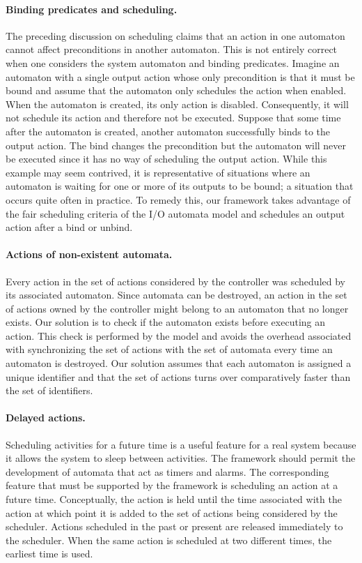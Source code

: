 \paragraph{Binding predicates and scheduling.}
The preceding discussion on scheduling claims that an action in one automaton cannot affect preconditions in another automaton.
This is not entirely correct when one considers the system automaton and binding predicates.
Imagine an automaton with a single output action whose only precondition is that it must be bound and assume that the automaton only schedules the action when enabled.
When the automaton is created, its only action is disabled.
Consequently, it will not schedule its action and therefore not be executed.
Suppose that some time after the automaton is created, another automaton successfully binds to the output action.
The bind changes the precondition but the automaton will never be executed since it has no way of scheduling the output action.
While this example may seem contrived, it is representative of situations where an automaton is waiting for one or more of its outputs to be bound; a situation that occurs quite often in practice.
To remedy this, our framework takes advantage of the fair scheduling criteria of the I/O automata model and schedules an output action after a bind or unbind.

\paragraph{Actions of non-existent automata.}
Every action in the set of actions considered by the controller was scheduled by its associated automaton.
Since automata can be destroyed, an action in the set of actions owned by the controller might belong to an automaton that no longer exists.
Our solution is to check if the automaton exists before executing an action.
This check is performed by the model and avoids the overhead associated with synchronizing the set of actions with the set of automata every time an automaton is destroyed.
Our solution assumes that each automaton is assigned a unique identifier and that the set of actions turns over comparatively faster than the set of identifiers.

\paragraph{Delayed actions.}
Scheduling activities for a future time is a useful feature for a real system because it allows the system to sleep between activities.
The framework should permit the development of automata that act as timers and alarms.
The corresponding feature that must be supported by the framework is scheduling an action at a future time.
Conceptually, the action is held until the time associated with the action at which point it is added to the set of actions being considered by the scheduler.
Actions scheduled in the past or present are released immediately to the scheduler.
When the same action is scheduled at two different times, the earliest time is used.

